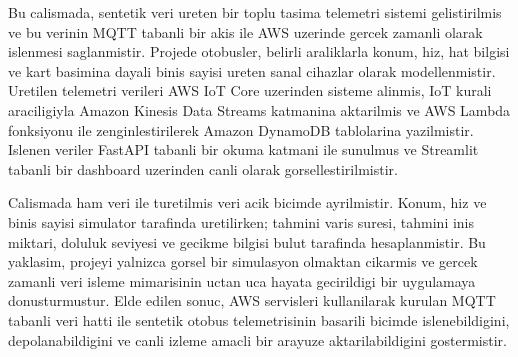 Bu calismada, sentetik veri ureten bir toplu tasima telemetri sistemi gelistirilmis ve bu verinin MQTT tabanli bir akis ile AWS uzerinde gercek zamanli olarak islenmesi saglanmistir. Projede otobusler, belirli araliklarla konum, hiz, hat bilgisi ve kart basimina dayali binis sayisi ureten sanal cihazlar olarak modellenmistir. Uretilen telemetri verileri AWS IoT Core uzerinden sisteme alinmis, IoT kurali araciligiyla Amazon Kinesis Data Streams katmanina aktarilmis ve AWS Lambda fonksiyonu ile zenginlestirilerek Amazon DynamoDB tablolarina yazilmistir. Islenen veriler FastAPI tabanli bir okuma katmani ile sunulmus ve Streamlit tabanli bir dashboard uzerinden canli olarak gorsellestirilmistir.

Calismada ham veri ile turetilmis veri acik bicimde ayrilmistir. Konum, hiz ve binis sayisi simulator tarafinda uretilirken; tahmini varis suresi, tahmini inis miktari, doluluk seviyesi ve gecikme bilgisi bulut tarafinda hesaplanmistir. Bu yaklasim, projeyi yalnizca gorsel bir simulasyon olmaktan cikarmis ve gercek zamanli veri isleme mimarisinin uctan uca hayata gecirildigi bir uygulamaya donusturmustur. Elde edilen sonuc, AWS servisleri kullanilarak kurulan MQTT tabanli veri hatti ile sentetik otobus telemetrisinin basarili bicimde islenebildigini, depolanabildigini ve canli izleme amacli bir arayuze aktarilabildigini gostermistir.
